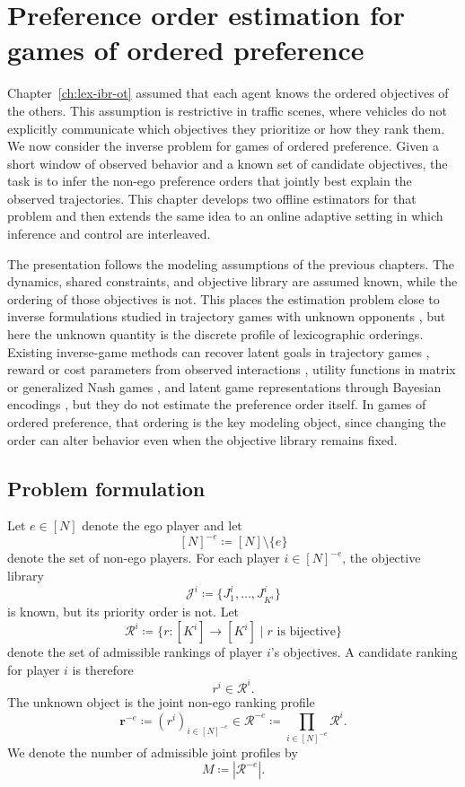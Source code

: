 \chapter{Preference order estimation for games of ordered preference}
\label{ch:estimation}

Chapter~\ref{ch:lex-ibr-ot} assumed that each agent knows the ordered objectives of the others.
This assumption is restrictive in traffic scenes, where vehicles do not explicitly communicate
which objectives they prioritize or how they rank them.
We now consider the inverse problem for games of ordered preference.
Given a short window of observed behavior and a known set of candidate objectives, the task is to
infer the non-ego preference orders that jointly best explain the observed trajectories.
This chapter develops two offline estimators for that problem and then extends the same idea to
an online adaptive setting in which inference and control are interleaved.

The presentation follows the modeling assumptions of the previous chapters.
The dynamics, shared constraints, and objective library are assumed known, while the ordering of
those objectives is not.
This places the estimation problem close to inverse formulations studied in trajectory games
with unknown opponents \cite{liu:2023}, but here the unknown quantity is the discrete
profile of lexicographic orderings. Existing inverse-game methods can recover
latent goals in trajectory games \cite{liu:2023}, reward or cost parameters from
observed interactions \cite{li:2023,wang:2018,yu:2019}, utility functions in
matrix or generalized Nash games \cite{yu:2023,allen:2022}, and latent
game representations through Bayesian encodings \cite{liu:2024}, but they do not estimate
the preference order itself. In games of ordered preference, that
ordering is the key modeling object, since changing the order can alter
behavior even when the objective library remains fixed.

\section{Problem formulation}
\label{sec:inverse-order-estimation}

Let \(e\in[N]\) denote the ego player and let
\[
[N]^{-e} \coloneq [N]\setminus\{e\}
\]
denote the set of non-ego players. For each player \(i\in[N]^{-e}\),
the objective library
\[
\mathcal J^i \coloneq \{J^i_1,\ldots,J^i_{K^i}\}
\]
is known, but its priority order is not. Let
\[
\mathcal R^i
\coloneq
\{r:[K^i]\to[K^i]\mid r \text{ is bijective}\}
\]
denote the set of admissible rankings of player \(i\)'s objectives.
A candidate ranking for player \(i\) is therefore
\[
r^i\in\mathcal R^i .
\]
The unknown object is the joint non-ego ranking profile
\[
\boldsymbol{r}^{-e}
\coloneq
(r^i)_{i\in[N]^{-e}}
\in
\mathcal R^{-e}
\coloneq
\prod_{i\in[N]^{-e}}\mathcal R^i .
\]
We denote the number of admissible joint profiles by
\[
M \coloneq |\mathcal R^{-e}|.
\]

